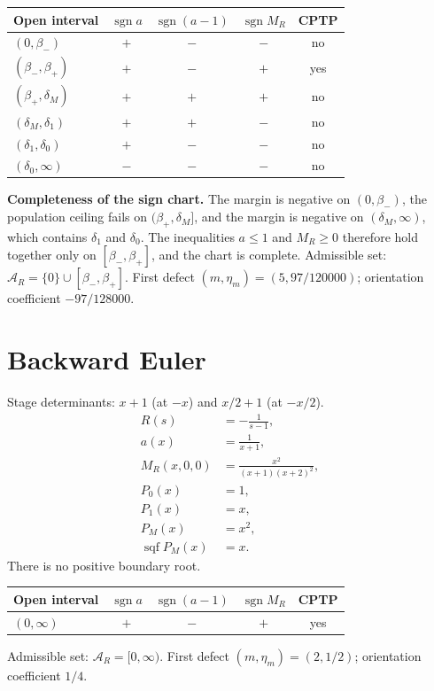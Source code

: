\documentclass[11pt]{article}
\begin{document}
\begin{center}
\begin{tabular}{@{}lcccc@{}}
\toprule
Open interval & $\operatorname{sgn}a$ & $\operatorname{sgn}(a-1)$ & $\operatorname{sgn}M_R$ & CPTP \\
\midrule
$(0,\beta_-)$ & $+$ & $-$ & $-$ & no \\
$(\beta_-,\beta_+)$ & $+$ & $-$ & $+$ & yes \\
$(\beta_+,\delta_M)$ & $+$ & $+$ & $+$ & no \\
$(\delta_M,\delta_1)$ & $+$ & $+$ & $-$ & no \\
$(\delta_1,\delta_0)$ & $+$ & $-$ & $-$ & no \\
$(\delta_0,\infty)$ & $-$ & $-$ & $-$ & no \\
\bottomrule
\end{tabular}
\end{center}
\textbf{Completeness of the sign chart.} The margin is negative on $(0,\beta_-)$, the population ceiling fails on $(\beta_+,\delta_M]$, and the margin is negative on $(\delta_M,\infty)$, which contains $\delta_1$ and $\delta_0$. The inequalities $a\le1$ and $M_R\ge0$ therefore hold together only on $[\beta_-,\beta_+]$, and the chart is complete. Admissible set: $\mathcal A_R=\{0\}\cup[\beta_-,\beta_+]$. First defect $(m,\eta_m)=(5,97/120000)$; orientation coefficient $-97/128000$.
\section{Backward Euler}
Stage determinants: $x + 1$ (at $-x$) and $x / 2 + 1$ (at $-x/2$).
\begin{align*}
R(s)&=- \frac{1}{s - 1},\\
a(x)&=\frac{1}{x + 1},\\
M_R(x,0,0)&=\frac{x^{2}}{\left(x + 1\right) \left(x + 2\right)^{2}},\\
P_0(x)&=1,\\
P_1(x)&=x,\\
P_M(x)&=x^{2},\\
\operatorname{sqf}P_M(x)&=x.
\end{align*}
There is no positive boundary root.
\begin{center}
\begin{tabular}{@{}lcccc@{}}
\toprule
Open interval & $\operatorname{sgn}a$ & $\operatorname{sgn}(a-1)$ & $\operatorname{sgn}M_R$ & CPTP \\
\midrule
$(0,\infty)$ & $+$ & $-$ & $+$ & yes \\
\bottomrule
\end{tabular}
\end{center}
Admissible set: $\mathcal A_R=[0,\infty)$. First defect $(m,\eta_m)=(2,1/2)$; orientation coefficient $1/4$.
\end{document}

